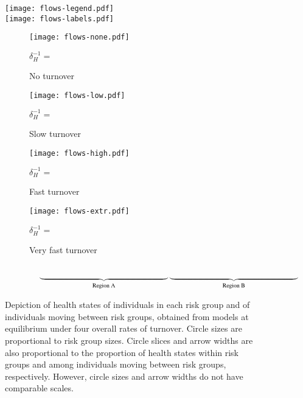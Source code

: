 \begin{figure}[!tbp]
  \centering
  \texttt{[image: flows-legend.pdf]}\\
  \texttt{[image: flows-labels.pdf]}
  \begin{subfigure}[t]{0.22\linewidth}
    \centering
    \texttt{[image: flows-none.pdf]}
    \caption{No turnover}
    \footnotesize $\delta_H^{-1} = $
    \label{fig:flows-none}
  \end{subfigure}%
  \begin{subfigure}[t]{0.22\linewidth}
    \centering
    \texttt{[image: flows-low.pdf]}
    \caption{Slow turnover}
    \footnotesize $\delta_H^{-1} = $
    \label{fig:flows-low}
  \end{subfigure}%
  \begin{subfigure}[t]{0.22\linewidth}
    \centering
    \texttt{[image: flows-high.pdf]}
    \caption{Fast turnover}
    \footnotesize $\delta_H^{-1} = $
    \label{fig:flows-high}
  \end{subfigure}%
  \begin{subfigure}[t]{0.22\linewidth}
    \centering
    \texttt{[image: flows-extr.pdf]}
    \caption{Very fast turnover}
    \footnotesize $\delta_H^{-1} = $
    \label{fig:flows-extr}
  \end{subfigure}\\[0.5em]
  $\null\hspace{0.11\linewidth}
  \underbrace{\hspace{0.44\linewidth}}_{\textrm{Region~A}}
  \underbrace{\hspace{0.44\linewidth}}_{\textrm{Region~B}}$
  \caption{Depiction of health states of individuals in each risk group		
    and of individuals moving between risk groups,
    obtained from models at equilibrium
    under four overall rates of turnover.
    Circle sizes are proportional to risk group sizes.
    Circle slices and arrow widths are also proportional to
    the proportion of health states within risk groups and
    among individuals moving between risk groups, respectively.
    However, circle sizes and arrow widths do not have comparable scales.}	%
  \label{fig:flows}
\end{figure}

